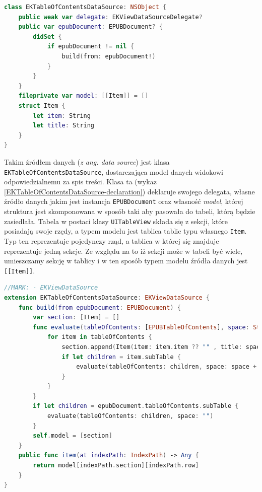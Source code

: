 \begin{lstlisting}[language=swift,caption={Deklaracja klasy \texttt{EKTableOfContentsDataSource}}, label=EKTableOfContentsDataSource-declaration]
class EKTableOfContentsDataSource: NSObject {
    public weak var delegate: EKViewDataSourceDelegate?
    public var epubDocument: EPUBDocument? {
        didSet {
            if epubDocument != nil {
                build(from: epubDocument!)
            }
        }
    }
    fileprivate var model: [[Item]] = []
    struct Item {
        let item: String
        let title: String
    }
}
\end{lstlisting}

Takim źródłem danych (\textit{z ang. data source}) jest klasa \texttt{EKTableOfContentsDataSource}, dostarczająca model danych widokowi odpowiedzialnemu za spis treści. Klasa ta (wykaz \ref{EKTableOfContentsDataSource-declaration}) deklaruje swojego delegata, własne źródło danych jakim jest instancja \texttt{EPUBDocument} oraz własność \textit{model}, której struktura jest skomponowana w sposób taki aby pasowała do tabeli, którą będzie zasiedlała.  Tabela w postaci klasy \texttt{UITableView} składa się z sekcji, które posiadają swoje rzędy, a typem modelu jest tablica tablic typu własnego \texttt{Item}. Typ ten reprezentuje pojedynczy rząd, a tablica w której się znajduje reprezentuje jedną sekcje. Ze względu na to iż sekcji może w tabeli być wiele, umieszczamy sekcję w tablicy i w ten sposób typem modelu źródła danych jest \texttt{[[Item]]}.

\begin{lstlisting}[language=swift,caption={Rozszerzenie klasy \texttt{EKTableOfContentsDataSource} o protokół \texttt{EKViewDataSource}}, label=EKTableOfContentsDataSource-extension-1]
//MARK: - EKViewDataSource
extension EKTableOfContentsDataSource: EKViewDataSource {
    func build(from epubDocument: EPUBDocument) {
        var section: [Item] = []
        func evaluate(tableOfContents: [EPUBTableOfContents], space: String) {
            for item in tableOfContents {
                section.append(Item(item: item.item ?? "" , title: space + item.label))
                if let children = item.subTable {
                    evaluate(tableOfContents: children, space: space + "    ")
                }
            }
        }
        if let children = epubDocument.tableOfContents.subTable {
            evaluate(tableOfContents: children, space: "")
        }
        self.model = [section]
    }
    public func item(at indexPath: IndexPath) -> Any {
        return model[indexPath.section][indexPath.row]
    }
}
\end{lstlisting}

